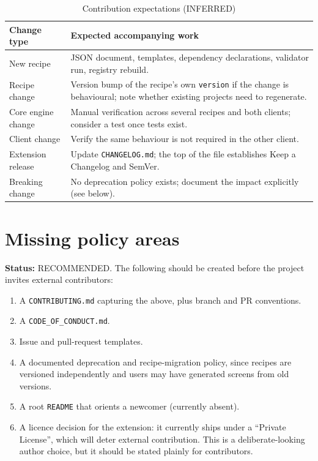 \begin{longtable}{p{4.2cm}p{10cm}}
\caption{Contribution expectations (INFERRED)}\\
\toprule
\textbf{Change type} & \textbf{Expected accompanying work} \\
\midrule

New recipe & JSON document, templates, dependency declarations, validator run,
registry rebuild. \\
Recipe change & Version bump of the recipe's own \texttt{version} if the change is
behavioural; note whether existing projects need to regenerate. \\
Core engine change & Manual verification across several recipes and both clients;
consider a test once tests exist. \\
Client change & Verify the same behaviour is not required in the other client. \\
Extension release & Update \texttt{CHANGELOG.md}; the top of the file establishes
Keep a Changelog and SemVer. \\
Breaking change & No deprecation policy exists; document the impact explicitly
(see below). \\
\bottomrule
\end{longtable}

\section{Missing policy areas}

\textbf{Status:} RECOMMENDED. The following should be created before the project
invites external contributors:

\begin{enumerate}
  \item A \texttt{CONTRIBUTING.md} capturing the above, plus branch and PR
        conventions.
  \item A \texttt{CODE\_OF\_CONDUCT.md}.
  \item Issue and pull-request templates.
  \item A documented deprecation and recipe-migration policy, since recipes are
        versioned independently and users may have generated screens from old
        versions.
  \item A root \texttt{README} that orients a newcomer (currently absent).
  \item A licence decision for the extension: it currently ships under a
        ``Private License'', which will deter external contribution. This is a
        deliberate-looking author choice, but it should be stated plainly for
        contributors.
\end{enumerate}

